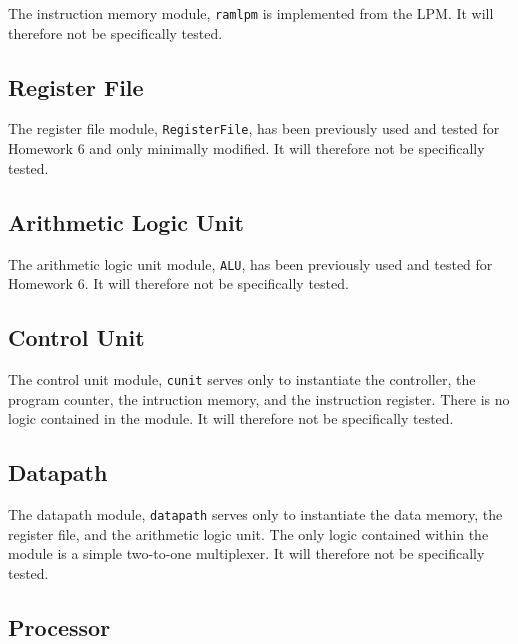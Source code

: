 The instruction memory module, \verb|ramlpm| is implemented from the LPM.
It will therefore not be specifically tested.

\subsection{Register File} %
\label{sub:register_file}

The register file module, \verb|RegisterFile|, has been previously used and tested for Homework 6 and only minimally modified.
It will therefore not be specifically tested.

\subsection{Arithmetic Logic Unit} %
\label{sub:arithmetic_logic_unit}

The arithmetic logic unit module, \verb|ALU|, has been previously used and tested for Homework 6.
It will therefore not be specifically tested.

\subsection{Control Unit} %
\label{sub:control_unit_pro}

The control unit module, \verb|cunit| serves only to instantiate the controller, the program counter, the intruction memory, and the instruction register.
There is no logic contained in the module.
It will therefore not be specifically tested.


\subsection{Datapath} %
\label{sub:datapath_pro}

The datapath module, \verb|datapath| serves only to instantiate the data memory, the register file, and the arithmetic logic unit.
The only logic contained within the module is a simple two-to-one multiplexer.
It will therefore not be specifically tested.


\subsection{Processor} %
\label{sub:processor_pro}

